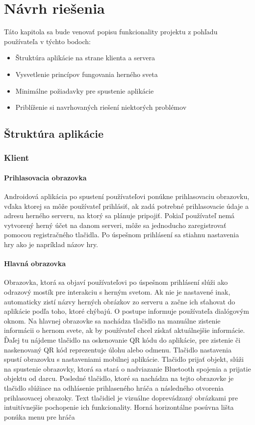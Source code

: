 \chapter{Návrh riešenia}
Táto kapitola sa bude venovať popisu funkcionality projektu z pohľadu používateľa v týchto bodoch:

\begin{itemize}
  \item Štruktúra aplikácie na strane klienta a servera
  \item Vysvetlenie princípov fungovania herného sveta
  \item Minimálne požiadavky pre spustenie aplikácie
  \item Priblíženie si navrhovaných riešení niektorých problémov
\end{itemize}




\section{Štruktúra aplikácie}
\subsection{Klient}
\subsubsection{Prihlasovacia obrazovka}
Androidová aplikácia po spustení používateľovi ponúkne prihlasovaciu obrazovku, vďaka ktorej sa môže používateľ prihlásiť, ak zadá potrebné prihlasovacie údaje a adresu herného serveru, na ktorý sa plánuje pripojiť. Pokiaľ používateľ nemá vytvorený herný účet na danom serveri, môže sa jednoducho zaregistrovať pomocou registračného tlačidla. Po úspešnom prihlásení sa stiahnu nastavenia hry ako je napríklad názov hry.

\subsubsection{Hlavná obrazovka}
Obrazovka, ktorá sa objaví používateľovi po úspešnom prihlásení slúži ako odrazový mostík pre interakciu s herným svetom. Ak nie je nastavené inak, automaticky zistí názvy herných obrázkov zo serveru a začne ich sťahovat do aplikácie podľa toho, ktoré chýbajú. O postupe informuje používateľa dialógovým oknom. Na hlavnej obrazovke sa nachádza tlačidlo na manuálne zistenie informácii o hernom svete, ak by používateľ chcel získať aktuálnejšie informácie. Ďaľej tu nájdeme tlačidlo na oskenovanie QR kódu do aplikácie, pre zistenie či naskenovaný QR kód reprezentuje úlohu alebo odmenu. Tlačidlo nastavenia spustí obrazovku s nastaveniami mobilnej aplikácie. Tlačidlo prijať objekt, slúži na spustenie obrazovky, ktorá sa stará o nadviazanie Bluetooth spojenia a prijatie objektu od darcu. Posledné tlačidlo, ktoré sa nachádza na tejto obrazovke je tlačidlo slúžiace na odhlásenie prihlaseného hráča a následného otvorenia prihlasovacej obrazoky. Text tlačidiel je vizuálne doprevádzaný obrázkami pre intuitívnejšie pochopenie ich funkcionality. Horná horizontálne posúvna lišta ponúka menu pre hráča

